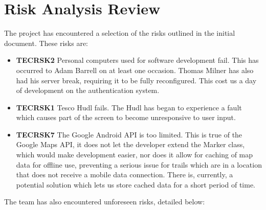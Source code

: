 \documentclass[11pt,a4paper]{article}
\begin{document}
\section{Risk Analysis Review}
The project has encountered a selection of the risks outlined in the initial document. These risks are:
\begin{itemize}
\item\textbf{TECRSK2} Personal computers used for software development fail. This has occurred to Adam Barrell on at least one occasion. Thomas Milner has also had his server break, requiring it to be fully reconfigured. This cost us a day of development on the authentication system.
\item\textbf{TECRSK1} Tesco Hudl fails. The Hudl has began to experience a fault which causes part of the screen to become unresponsive to user input.
\item\textbf{TECRSK7} The Google Android API is too limited. This is true of the Google Maps API, it does not let the developer extend the Marker class, which would make development easier, nor does it allow for caching of map data for offline use, preventing a serious issue for trails which are in a location that does not receive a mobile data connection. There is, currently, a potential solution which lets us store cached data for a short period of time.
\end{itemize}
The team has also encountered unforeseen risks, detailed below:
\end{document}
